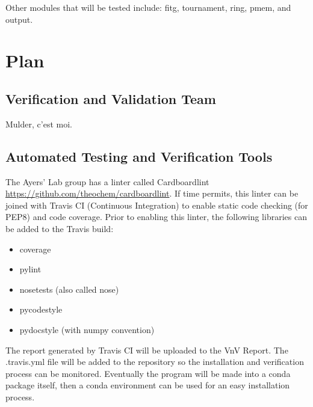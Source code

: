 \documentclass[12pt, titlepage]{article}
\begin{document}
Other modules that will be tested include: fitg, tournament, ring, pmem, and 
output.


\section{Plan}
	
\subsection{Verification and Validation Team}

Mulder, c'est moi.

\subsection{Automated Testing and Verification Tools}

The Ayers' Lab group has a linter called Cardboardlint 
\url{https://github.com/theochem/cardboardlint}. If time permits, this linter 
can be joined with Travis CI (Continuous Integration) to enable static code 
checking (for PEP8) and code coverage. Prior to enabling this linter, the 
following libraries can be added to the Travis build:

\begin{itemize}
	\item coverage
	\item pylint
	\item nosetests (also called nose)
	\item pycodestyle
	\item pydocstyle (with numpy convention)
\end{itemize}

The report generated by Travis CI will be uploaded to the VnV Report. The 
.travis.yml file will be added to the \progname{} repository so the 
installation and verification process can be monitored. Eventually the program 
will be made into a conda package itself, then a conda environment can be used 
for an easy installation process.

\end{document}
